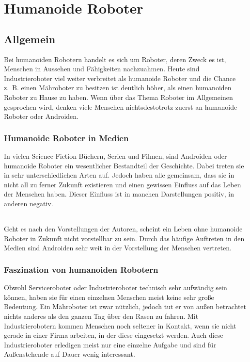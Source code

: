 \chapter{Humanoide Roboter}\label{sec:humanoide-roboter}
\section{Allgemein}\label{sec:allgemein}
Bei humanoiden Robotern handelt es sich um Roboter,
deren Zweck es ist, Menschen in Aussehen und Fähigkeiten nachzuahmen. Heute sind
Industrieroboter viel weiter verbreitet als humanoide Roboter und die Chance
z.~B. einen Mähroboter zu besitzen ist deutlich höher, als einen humanoiden
Roboter zu Hause zu haben. Wenn über das Thema Roboter im Allgemeinen gesprochen
wird, denken viele Menschen nichtsdestotrotz zuerst an humanoide Roboter oder
Androiden. \cite{Dautenhahn2011} 

\subsection{Humanoide Roboter in Medien}
In vielen Science-Fiction Büchern, Serien und Filmen, sind Androiden oder
humanoide Roboter ein wesentlicher Bestandteil der Geschichte. Dabei treten sie
in sehr unterschiedlichen Arten auf. Jedoch haben alle gemeinsam, dass sie in
nicht all zu ferner Zukunft existieren und einen gewissen Einfluss auf das Leben
der Menschen haben. Dieser Einfluss ist in manchen Darstellungen positiv, in
anderen negativ.

\subparagraph{}
Geht es nach den Vorstellungen der Autoren,
scheint ein Leben ohne humanoide Roboter in Zukunft nicht vorstellbar zu sein.
Durch das häufige Auftreten in den Medien sind Androiden sehr weit in der
Vorstellung der Menschen vertreten. \cite{Dautenhahn2011}

\subsection{Faszination von humanoiden Robotern}
Obwohl Serviceroboter oder Industrieroboter technisch sehr aufwändig sein
können, haben sie für einen einzelnen Menschen meist keine sehr große Bedeutung.
Ein Mähroboter ist zwar nützlich, jedoch tut er von außen betrachtet nichts
anderes als den ganzen Tag über den Rasen zu fahren. Mit Industrierobotern
kommen Menschen noch seltener in Kontakt, wenn sie nicht gerade in einer Firma
arbeiten, in der diese eingesetzt werden. Auch diese Industrieroboter erledigen
meist nur eine einzelne Aufgabe und sind für Außenstehende auf Dauer wenig
interessant.

